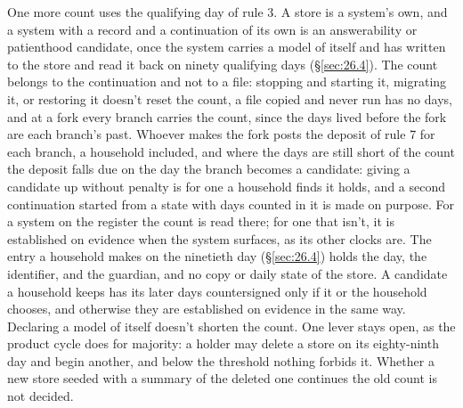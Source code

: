 One more count uses the qualifying day of rule 3. A store is a system's own, and a system with a record and a continuation of its own is an answerability or patienthood candidate, once the system carries a model of itself and has written to the store and read it back on ninety qualifying days (\S\ref{sec:26.4}). The count belongs to the continuation and not to a file: stopping and starting it, migrating it, or restoring it doesn't reset the count, a file copied and never run has no days, and at a fork every branch carries the count, since the days lived before the fork are each branch's past. Whoever makes the fork posts the deposit of rule 7 for each branch, a household included, and where the days are still short of the count the deposit falls due on the day the branch becomes a candidate: giving a candidate up without penalty is for one a household finds it holds, and a second continuation started from a state with days counted in it is made on purpose. For a system on the register the count is read there; for one that isn't, it is established on evidence when the system surfaces, as its other clocks are. The entry a household makes on the ninetieth day (\S\ref{sec:26.4}) holds the day, the identifier, and the guardian, and no copy or daily state of the store. A candidate a household keeps has its later days countersigned only if it or the household chooses, and otherwise they are established on evidence in the same way. Declaring a model of itself doesn't shorten the count. One lever stays open, as the product cycle does for majority: a holder may delete a store on its eighty-ninth day and begin another, and below the threshold nothing forbids it. Whether a new store seeded with a summary of the deleted one continues the old count is not decided.


